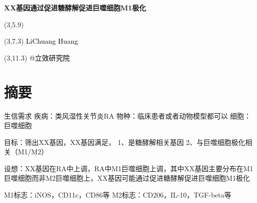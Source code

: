 \documentclass[
  ignorenonframetext,
]{beamer}
\author{}
\date{\vspace{-2.5em}}
\begin{document}
\begin{frame}
\begin{titlepage} 
\begin{center} \textbf{\Huge
XX基因通过促进糖酵解促进巨噬细胞M1极化}
\vspace{4em} \begin{textblock}{10}(3,5.9) \huge
\textbf{\textcolor{white}{2024-06-03}}
\end{textblock} \begin{textblock}{10}(3,7.3)
\Large \textcolor{black}{LiChuang Huang}
\end{textblock} \begin{textblock}{10}(3,11.3)
\Large \textcolor{black}{@立效研究院}
\end{textblock} \end{center} \end{titlepage}
\restoregeometry


\tableofcontents

\listoffigures

\listoftables



\end{frame}

\hypertarget{abstract}{%
\section{摘要}\label{abstract}}

\begin{frame}{生信需求}
\protect\hypertarget{ux751fux4fe1ux9700ux6c42}{}
疾病：类风湿性关节炎RA 物种：临床患者或者动物模型都可以 细胞：巨噬细胞

目标：筛出XX基因，XX基因满足， 1、是糖酵解相关基因
2、与巨噬细胞极化相关（M1/M2）

设想：XX基因在RA中上调，RA中M1巨噬细胞上调，其中XX基因主要分布在M1巨噬细胞而非M2巨噬细胞上，XX基因可能通过促进糖酵解促进巨噬细胞M1极化

M1标志：iNOS，CD11c，CD86等 M2标志：CD206，IL-10，TGF-beta等
\end{frame}
\end{document}
